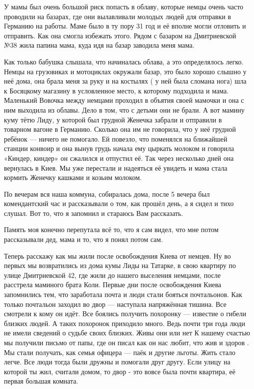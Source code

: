 У мамы был очень большой риск попасть в облаву, которые немцы очень часто
проводили на базарах, где они вылавливали молодых людей для отправки в Германию
на работы. Маме было в ту пору 31 год и её вполне могли отловить и отправить.
Как она смогла избежать этого. Рядом с базаром на Дмитриевской №38 жила папина
мама, куда идя на базар заводила меня мама. 

Как только бабушка слышала, что
начиналась облава, а это определялось легко. Немцы на грузовиках и мотоциклах
окружали базар, это было хорошо слышно у неё дома, она брала меня за руку и на
костылях ( у ней была сломана нога) шла к Босяцкому магазину в условленное
место, к которому подходила и мама. Маленький Вовочка между немцами проходил в
объятия своей мамочки и она с ним выходила из облавы. Дело в том, что с детьми
они не брали. А вот мамину куму  тётю Лиду, у которой был грудной Женечка
забрали и отправили  в товарном вагоне в Германию. Сколько она им не говорила,
что у неё грудной ребёнок — ничего не помогало.  Ей повезло, что поменялся  на
ближайшей станции конвоир и она вынув грудь  начала ему цыркать  молоком и
говорила «Киндер, киндер» он  сжалился и отпустил её. Так через несколько дней
она вернулась в Киев.   Мы уже перестали и надеяться её увидеть и мама стала
кормить Женечку кашками и козьим молоком.

По вечерам вся  наша коммуна,  собиралась дома, после 5 вечера был
комендантский час и рассказывали о том, как прошёл день, а я сидел и тихо
слушал. Вот то, что я запомнил и стараюсь Вам рассказать.

Память моя конечно перепутала всё то, что я сам видел, что мне потом
рассказывали дед, мама и то, что я понял потом сам.

Теперь расскажу как мы жили после освобождения Киева от немцев. Ну во первых мы
возвратились из дома кумы Лиды на Татарке,   в свою квартиру по улице
Дмитриевской 42, где жили до нашего выселения немцами, после расстрела маминого
брата Коли.  Первые дни после освобождения Киева запомнились тем, что
заработала почта и люди стали бояться почтальонов. Как только почтальон заходил
во двор — наступала напряжённая тишина. Все смотрели к кому он  идёт. Все
боялись получить похоронку — известие о гибели близких людей. А таких похоронок
приходило много. Ведь почти три года люди не имели сведений о судьбе своих
близких. Живы они или нет К нашему счастью мы получили письмо от папы, где он
писал как он нас любит, что жив и здоров . Мы стали получать, как семья офицера
— паёк и другие льготы. Жить стало легче. Все люди тогда были дружны и помогали
друг другу. Если улицу на которой ты жил, считали домом, то двор  -  это вовсе
была почти квартира, её первая большая комната.

